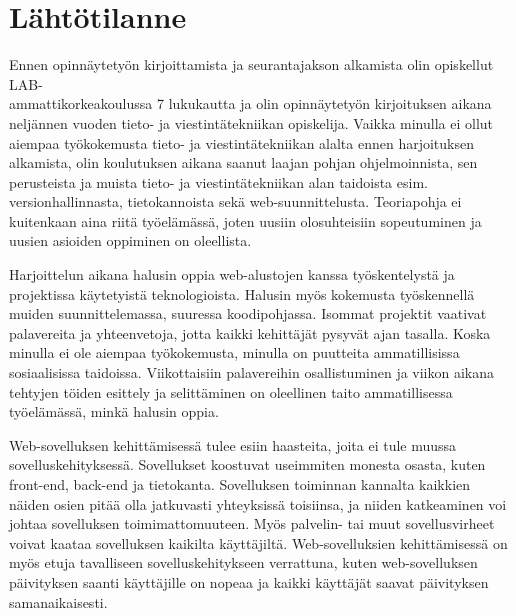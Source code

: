 \documentclass[11pt,a4paper,titlepage,oneside]{article}
\begin{document}
\medskip










\newpage
\section{Lähtötilanne}         %




Ennen opinnäytetyön kirjoittamista ja seurantajakson alkamista olin opiskellut LAB-\\ammattikorkeakoulussa 7 lukukautta ja
olin opinnäytetyön kirjoituksen aikana neljännen vuoden tieto- ja viestintätekniikan opiskelija.
Vaikka minulla ei ollut aiempaa työkokemusta tieto- ja viestintätekniikan alalta ennen harjoituksen alkamista,
olin koulutuksen aikana saanut laajan pohjan ohjelmoinnista,
sen perusteista ja muista tieto- ja viestintätekniikan alan taidoista esim. versionhallinnasta, tietokannoista sekä web-suunnittelusta.
Teoriapohja ei kuitenkaan aina riitä työelämässä, joten uusiin olosuhteisiin sopeutuminen ja uusien asioiden oppiminen on oleellista.
\medskip




Harjoittelun aikana halusin oppia web-alustojen kanssa työskentelystä ja projektissa käytetyistä teknologioista.
Halusin myös kokemusta työskennellä muiden suunnittelemassa, suuressa koodipohjassa.
Isommat projektit vaativat palavereita ja yhteenvetoja, jotta kaikki kehittäjät pysyvät ajan tasalla.
Koska minulla ei ole aiempaa työkokemusta, minulla on puutteita ammatillisissa sosiaalisissa taidoissa.
%
Viikottaisiin palavereihin osallistuminen ja viikon aikana tehtyjen töiden esittely 
ja selittäminen on oleellinen taito ammatillisessa työelämässä, minkä halusin oppia.
\medskip


Web-sovelluksen kehittämisessä tulee esiin haasteita, joita ei tule muussa sovelluskehityksessä.
Sovellukset koostuvat useimmiten monesta osasta, kuten front-end, back-end ja tietokanta.
% 
Sovelluksen toiminnan kannalta kaikkien näiden osien pitää olla jatkuvasti yhteyksissä toisiinsa, ja niiden katkeaminen 
voi johtaa sovelluksen toimimattomuuteen.
Myös palvelin- tai muut sovellusvirheet voivat kaataa sovelluksen kaikilta käyttäjiltä. 
Web-sovelluksien kehittämisessä on myös etuja tavalliseen sovelluskehitykseen verrattuna, kuten 
web-sovelluksen päivityksen saanti käyttäjille on nopeaa ja kaikki käyttäjät saavat päivityksen samanaikaisesti.
\medskip
\end{document}
